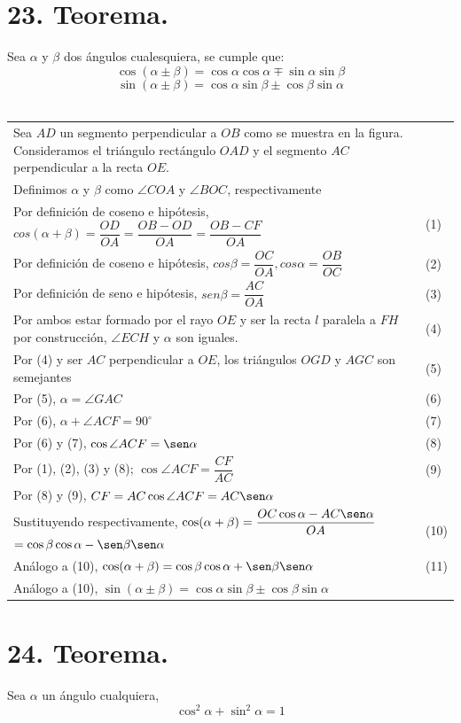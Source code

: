 \documentclass[12pt,a4paper, oneside]{book}
\begin{document}
\section{23. Teorema.}
Sea $\alpha$ y $\beta$ dos ángulos cualesquiera, se cumple que:$$\cos ( \alpha \pm \beta) = \cos \alpha \cos \alpha \mp \sin \alpha \sin \beta$$
$$\sin (\alpha \pm \beta) = \cos \alpha \sin \beta \pm \cos \beta \sin \alpha$$
\\
\begin{tabular}{p{15.9 cm} p{1cm}}
Sea $AD$ un segmento perpendicular a $OB$ como se muestra en la figura. Consideramos el triángulo rectángulo $OAD$ y el segmento $AC$ perpendicular a la recta $OE$.
\\Definimos $\alpha$ y $\beta$ como $\angle COA$ y $\angle BOC$, respectivamente
\\Por definición de coseno e hipótesis, $cos(\alpha + \beta) = \dfrac{OD}{OA}=\dfrac{OB-OD}{OA}=\dfrac{OB-CF}{OA}$ &(1)
\\Por definición de coseno e hipótesis,
$cos \beta = \dfrac{OC}{OA}, cos \alpha = \dfrac{OB}{OC}$ &(2)
\\Por definición de seno e hipótesis, $sen \beta = \dfrac{AC}{OA}$ &(3)
\\Por ambos estar formado por el rayo $OE$ y ser la recta $l$ paralela a $FH$ por construcción, $\angle ECH$ y $\alpha$ son iguales. &\medskip(4)
\\Por (4) y ser $AC$ perpendicular a $OE$, los triángulos $OGD$ y $AGC$ son semejantes &(5)
\\Por (5), $\alpha =\angle GAC$ &(6)
\\Por (6), $\alpha + \angle ACF= 90^{\circ}$  &(7)
\\Por (6) y (7), $\cos \angle ACF = \sen \alpha$&(8)
\\Por (1), (2), (3) y (8); $\cos \angle ACF = \dfrac{CF}{AC}$ &(9)
\\Por (8) y (9), $CF= AC \cos \angle ACF= AC \sen \alpha$
\\Sustituyendo respectivamente, $ \cos( \alpha + \beta)=\dfrac{OC \cos \alpha - AC \sen \alpha}{OA}$ $=\cos \beta \cos \alpha - \sen \beta \sen \alpha$ &(10)
\\Análogo a (10), $\cos (\alpha + \beta)= \cos \beta \cos \alpha + \sen \beta \sen \alpha $ &(11)
\\Análogo a (10), $\sin (\alpha \pm \beta) = \cos \alpha \sin \beta \pm \cos \beta \sin \alpha$
\end{tabular}
\section{24. Teorema.}
Sea $\alpha$ un ángulo cualquiera,$$\cos^ 2 \alpha + \sin ^2 \alpha =1$$
\end{document}
